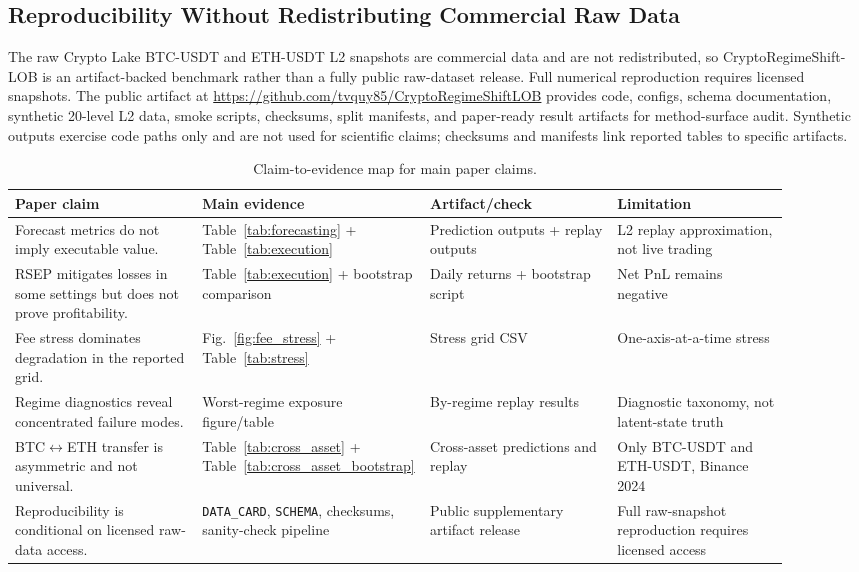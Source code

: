 \documentclass[conference]{IEEEtran}
\begin{document}
\subsection{Reproducibility Without Redistributing Commercial Raw Data}
The raw Crypto Lake BTC-USDT and ETH-USDT L2 snapshots are commercial data and are not redistributed, so CryptoRegimeShift-LOB is an artifact-backed benchmark rather than a fully public raw-dataset release. Full numerical reproduction requires licensed snapshots. The public artifact at \url{https://github.com/tvquy85/CryptoRegimeShiftLOB} provides code, configs, schema documentation, synthetic 20-level L2 data, smoke scripts, checksums, split manifests, and paper-ready result artifacts for method-surface audit. Synthetic outputs exercise code paths only and are not used for scientific claims; checksums and manifests link reported tables to specific artifacts.

\begin{table}[t]
\centering
\caption{Claim-to-evidence map for main paper claims.}
\label{tab:claim_evidence_map}
\scriptsize
\setlength{\tabcolsep}{2pt}
\begin{tabular}{p{0.24\linewidth}p{0.20\linewidth}p{0.24\linewidth}p{0.22\linewidth}}
\toprule
Paper claim & Main evidence & Artifact/check & Limitation \\
\midrule
Forecast metrics do not imply executable value. & Table~\ref{tab:forecasting} + Table~\ref{tab:execution} & Prediction outputs + replay outputs & L2 replay approximation, not live trading \\
RSEP mitigates losses in some settings but does not prove profitability. & Table~\ref{tab:execution} + bootstrap comparison & Daily returns + bootstrap script & Net PnL remains negative \\
Fee stress dominates degradation in the reported grid. & Fig.~\ref{fig:fee_stress} + Table~\ref{tab:stress} & Stress grid CSV & One-axis-at-a-time stress \\
Regime diagnostics reveal concentrated failure modes. & Worst-regime exposure figure/table & By-regime replay results & Diagnostic taxonomy, not latent-state truth \\
BTC$\leftrightarrow$ETH transfer is asymmetric and not universal. & Table~\ref{tab:cross_asset} + Table~\ref{tab:cross_asset_bootstrap} & Cross-asset predictions and replay & Only BTC-USDT and ETH-USDT, Binance 2024 \\
Reproducibility is conditional on licensed raw-data access. & \texttt{DATA\_CARD}, \texttt{SCHEMA}, checksums, sanity-check pipeline & Public supplementary artifact release & Full raw-snapshot reproduction requires licensed access \\
\bottomrule
\end{tabular}
\end{table}
\end{document}
